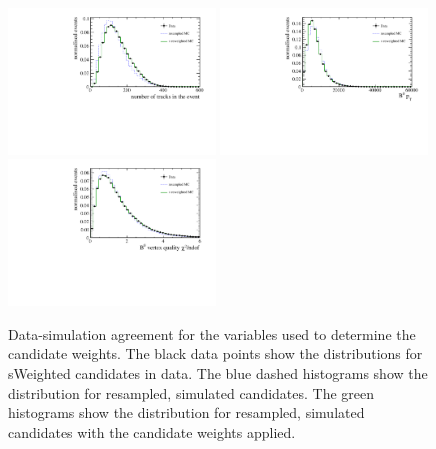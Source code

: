 \begin{figure}[!tb]
 \centering
 \includegraphics[width=0.49\textwidth]{figs/kpimm/data-mc/reweighting/nTracks.pdf}
 \includegraphics[width=0.49\textwidth]{figs/kpimm/data-mc/reweighting/B0_PT.pdf}
 \includegraphics[width=0.49\textwidth]{figs/kpimm/data-mc/reweighting/B0_VertexChi2.pdf}
 
 \caption{Data-simulation agreement for the variables used to determine the candidate weights. The black data points show the distributions for sWeighted \BdToJPsiKst candidates in data. The blue dashed histograms show the distribution for resampled, simulated \BdToJPsiKst candidates. The green histograms show the distribution for resampled, simulated \BdToJPsiKst candidates with the candidate weights applied.}
 \label{fig:data-mc:reweight}
\end{figure}
 
